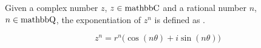 \begin{definition}\label{def:de_Moivers_Law}
  Given a complex number $z$, $z \in \operatorname{mathbb{C}}$ and a rational number $n$, $n \in \operatorname{mathbb{Q}}$, the exponentiation of $z^{n}$ is defined as .

  \begin{equation}\label{eq:Polar_Form_Exponentiation}
    z^{n} = r^{n} \bigl( \cos(n \theta) + i \sin(n \theta) \bigr)
  \end{equation}
\end{definition}

